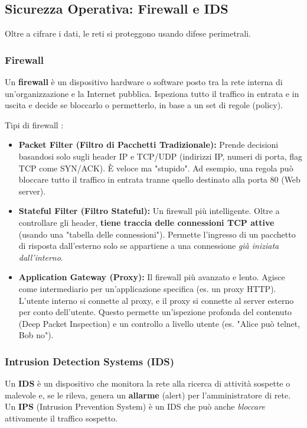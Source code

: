 \begin{enumerate}
\subsection{Sicurezza Operativa: Firewall e IDS}
Oltre a cifrare i dati, le reti si proteggono usando difese perimetrali.

\subsubsection{Firewall}
Un \textbf{firewall} è un dispositivo hardware o software posto tra la rete interna di un'organizzazione e la Internet pubblica. Ispeziona tutto il traffico in entrata e in uscita e decide se bloccarlo o permetterlo, in base a un set di regole (policy).

Tipi di firewall :
\begin{itemize}
    \item \textbf{Packet Filter (Filtro di Pacchetti Tradizionale):} Prende decisioni basandosi solo sugli header IP e TCP/UDP (indirizzi IP, numeri di porta, flag TCP come SYN/ACK). È veloce ma "stupido". Ad esempio, una regola può bloccare tutto il traffico in entrata tranne quello destinato alla porta 80 (Web server).
    \item \textbf{Stateful Filter (Filtro Stateful):} Un firewall più intelligente. Oltre a controllare gli header, \textbf{tiene traccia delle connessioni TCP attive} (usando una "tabella delle connessioni"). Permette l'ingresso di un pacchetto di risposta dall'esterno solo se appartiene a una connessione \textit{già iniziata dall'interno}.
    \item \textbf{Application Gateway (Proxy):} Il firewall più avanzato e lento. Agisce come intermediario per un'applicazione specifica (es. un proxy HTTP). L'utente interno si connette al proxy, e il proxy si connette al server esterno per conto dell'utente. Questo permette un'ispezione profonda del contenuto (Deep Packet Inspection) e un controllo a livello utente (es. "Alice può telnet, Bob no").
\end{itemize}

\subsubsection{Intrusion Detection Systems (IDS)}
Un \textbf{IDS} è un dispositivo che monitora la rete alla ricerca di attività sospette o malevole e, se le rileva, genera un \textbf{allarme} (alert) per l'amministratore di rete. Un \textbf{IPS} (Intrusion Prevention System) è un IDS che può anche \textit{bloccare} attivamente il traffico sospetto.


\end{enumerate}

